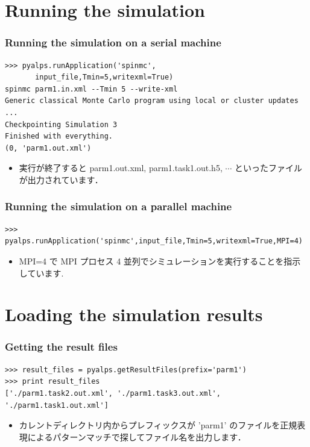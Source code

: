 \section{Running the simulation}
\begin{frame}[t,fragile]
\frametitle{Running the simulation on a serial machine}
\begin{lstlisting}
>>> pyalps.runApplication('spinmc',
       input_file,Tmin=5,writexml=True)
spinmc parm1.in.xml --Tmin 5 --write-xml
Generic classical Monte Carlo program using local or cluster updates
...
Checkpointing Simulation 3
Finished with everything.
(0, 'parm1.out.xml')
\end{lstlisting}
\begin{itemize}
\item 実行が終了すると parm1.out.xml, parm1.task1.out.h5, $\cdots$ といったファイルが出力されています．
\end{itemize}
 
\end{frame}

\begin{frame}[t,fragile]
\frametitle{Running the simulation on a parallel machine}
\begin{lstlisting}
>>> pyalps.runApplication('spinmc',input_file,Tmin=5,writexml=True,MPI=4)
\end{lstlisting}
\begin{itemize}
\item MPI=4 で MPI プロセス 4 並列でシミュレーションを実行することを指示しています.
\end{itemize}

\end{frame}

\section{Loading the simulation results}
\begin{frame}[t,fragile]
\frametitle{Getting the result files}
\begin{lstlisting}
>>> result_files = pyalps.getResultFiles(prefix='parm1')
>>> print result_files
['./parm1.task2.out.xml', './parm1.task3.out.xml', './parm1.task1.out.xml']
\end{lstlisting}
\begin{itemize}
\item カレントディレクトリ内からプレフィックスが 'parm1' のファイルを正規表現によるパターンマッチで探してファイル名を出力します．
\end{itemize}

\end{frame}

